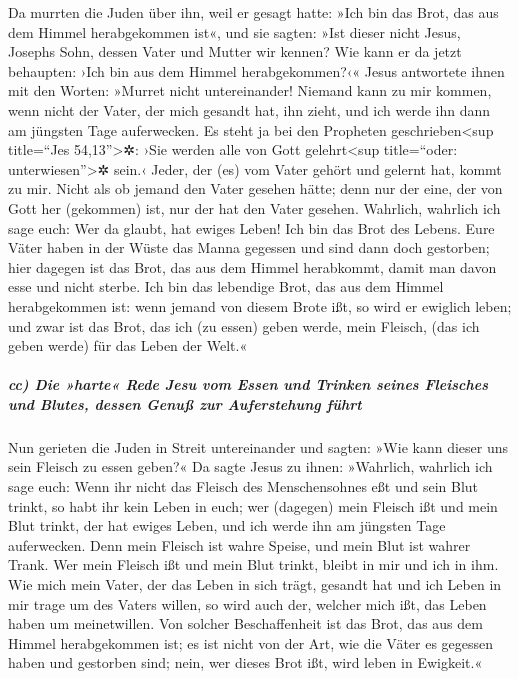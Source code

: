  Da murrten die Juden über ihn, weil er gesagt hatte:
»Ich bin das Brot, das aus dem Himmel herabgekommen ist«,
 und sie sagten: »Ist dieser nicht Jesus, Josephs Sohn,
dessen Vater und Mutter wir kennen? Wie kann er da jetzt behaupten: ›Ich
bin aus dem Himmel herabgekommen?‹«  Jesus antwortete
ihnen mit den Worten: »Murret nicht untereinander! 
Niemand kann zu mir kommen, wenn nicht der Vater, der mich gesandt hat,
ihn zieht, und ich werde ihn dann am jüngsten Tage auferwecken.
 Es steht ja bei den Propheten geschrieben\textless sup
title=``Jes 54,13''\textgreater✲: ›Sie werden alle von Gott
gelehrt\textless sup title=``oder: unterwiesen''\textgreater✲ sein.‹
Jeder, der (es) vom Vater gehört und gelernt hat, kommt zu mir.
 Nicht als ob jemand den Vater gesehen hätte; denn nur
der eine, der von Gott her (gekommen) ist, nur der hat den Vater
gesehen.  Wahrlich, wahrlich ich sage euch: Wer da
glaubt, hat ewiges Leben!  Ich bin das Brot des Lebens.
 Eure Väter haben in der Wüste das Manna gegessen und
sind dann doch gestorben;  hier dagegen ist das Brot, das
aus dem Himmel herabkommt, damit man davon esse und nicht sterbe.
 Ich bin das lebendige Brot, das aus dem Himmel
herabgekommen ist: wenn jemand von diesem Brote ißt, so wird er ewiglich
leben; und zwar ist das Brot, das ich (zu essen) geben werde, mein
Fleisch, (das ich geben werde) für das Leben der Welt.«

\hypertarget{cc-die-harte-rede-jesu-vom-essen-und-trinken-seines-fleisches-und-blutes-dessen-genuuxdf-zur-auferstehung-fuxfchrt}{%
\subparagraph{cc) Die »harte« Rede Jesu vom Essen und Trinken seines
Fleisches und Blutes, dessen Genuß zur Auferstehung
führt}\label{cc-die-harte-rede-jesu-vom-essen-und-trinken-seines-fleisches-und-blutes-dessen-genuuxdf-zur-auferstehung-fuxfchrt}}

 Nun gerieten die Juden in Streit untereinander und
sagten: »Wie kann dieser uns sein Fleisch zu essen geben?«
 Da sagte Jesus zu ihnen: »Wahrlich, wahrlich ich sage
euch: Wenn ihr nicht das Fleisch des Menschensohnes eßt und sein Blut
trinkt, so habt ihr kein Leben in euch;  wer (dagegen)
mein Fleisch ißt und mein Blut trinkt, der hat ewiges Leben, und ich
werde ihn am jüngsten Tage auferwecken.  Denn mein
Fleisch ist wahre Speise, und mein Blut ist wahrer Trank.
 Wer mein Fleisch ißt und mein Blut trinkt, bleibt in mir
und ich in ihm.  Wie mich mein Vater, der das Leben in
sich trägt, gesandt hat und ich Leben in mir trage um des Vaters willen,
so wird auch der, welcher mich ißt, das Leben haben um meinetwillen.
 Von solcher Beschaffenheit ist das Brot, das aus dem
Himmel herabgekommen ist; es ist nicht von der Art, wie die Väter es
gegessen haben und gestorben sind; nein, wer dieses Brot ißt, wird leben
in Ewigkeit.«


